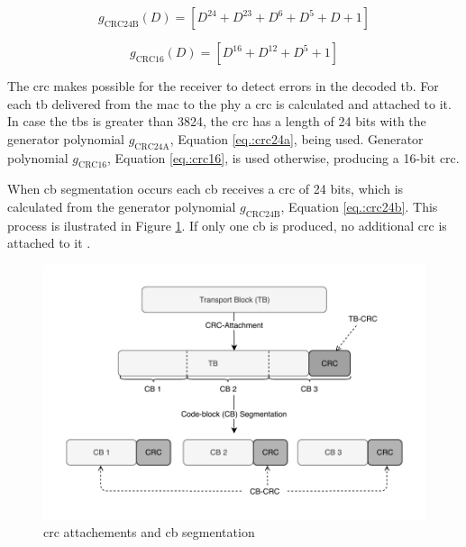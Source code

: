 \begin{equation}\label{eq.:crc24b}
    g_{\mathrm{CRC24B}}(D) = \left[ D^{24} + D^{23} + D^{6} + D^{5} + D + 1 \right]
\end{equation}

\begin{equation} \label{eq.:crc16}
    g_{\mathrm{CRC16}}(D) = \left[ D^{16} + D^{12} + D^{5} + 1 \right]
\end{equation}


The \gls{crc} makes possible for the receiver to detect errors in the decoded \gls{tb}.
%
For each \gls{tb} delivered from the \gls{mac} to the \gls{phy} a \gls{crc} is calculated and attached to it.
%
In case the \gls{tbs} is greater than 3824, the \gls{crc} has a length of 24 bits with the generator polynomial $g_{\mathrm{CRC24A}}$, Equation \eqref{eq.:crc24a}, being used.
%
Generator polynomial $g_{\mathrm{CRC16}}$, Equation \eqref{eq.:crc16}, is used otherwise, producing a 16-bit \gls{crc}.

When \gls{cb} segmentation occurs each \gls{cb} receives a \gls{crc} of 24 bits, which is calculated from the generator polynomial $g_{\mathrm{CRC24B}}$, Equation \eqref{eq.:crc24b}.
%
This process is ilustrated in Figure \ref{fig:cbcrc}.
%
If only one \gls{cb} is produced, no additional \gls{crc} is attached to it \cite{ErikDahlman5G}.

\begin{figure}[htb]
    \includegraphics[width=\columnwidth]{figures/chp_theory/crc.pdf}
    \caption{\gls{crc} attachements and \gls{cb} segmentation}
    \label{fig:cbcrc}
\end{figure}


%




